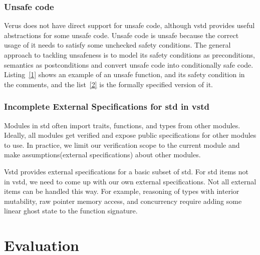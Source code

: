 \documentclass[conference]{IEEEtran}
\begin{document}
\subsubsection{Unsafe code}
Verus does not have direct support for unsafe code, although vstd provides useful abstractions for some unsafe code. Unsafe code is unsafe because the correct usage of it needs to satisfy some unchecked safety conditions. The general approach to tackling unsafeness is to model its safety conditions as preconditions, semantics as postconditions and convert unsafe code into conditionally safe code. Listing~\ref{1} shows an example of an unsafe function, and its safety condition in the comments, and the list~\ref{2} is the formally specified version of it.   

\subsubsection{Incomplete External Specifications for std in vstd}
Modules in std often import traits, functions, and types from other modules. Ideally, all modules get verified and expose public specifications for other modules to use. In practice, we limit our verification scope to the current module and make assumptions(external specifications) about other modules. 

Vstd provides external specifications for a basic subset of std. For std items not in vstd, we need to come up with our own external specifications. Not all external items can be handled this way. For example, reasoning of types with interior mutability, raw pointer memory access, and concurrency require adding some linear ghost state to the function signature.  

\section{Evaluation}
\end{document}
